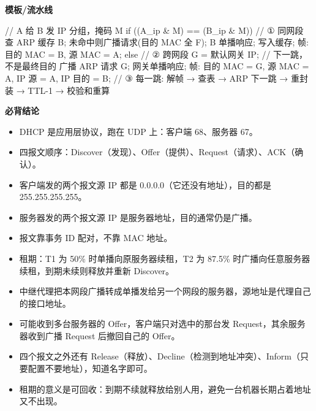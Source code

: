 \documentclass[10pt,a4paper]{ctexart}
\begin{document}
\textbf{模板/流水线}

\begin{codebox}
// A 给 B 发 IP 分组，掩码 M
if ((A_ip & M) == (B_ip & M)) {         // ① 同网段
    查 ARP 缓存 B; 未命中则广播请求(目的 MAC 全 F);
    B 单播响应; 写入缓存;
    帧: 目的 MAC = B, 源 MAC = A;
} else {                                // ② 跨网段
    G = 默认网关 IP;                     // 下一跳，不是最终目的
    广播 ARP 请求 G; 网关单播响应;
    帧: 目的 MAC = G, 源 MAC = A, IP 源 = A, IP 目的 = B;
}
// ③ 每一跳: 解帧 → 查表 → ARP 下一跳 → 重封装 → TTL-1 → 校验和重算
\end{codebox}




\textbf{必背结论}

\begin{itemize}

\item DHCP 是应用层协议，跑在 UDP 上：客户端 68、服务器 67。

\item 四报文顺序：Discover（发现）、Offer（提供）、Request（请求）、ACK（确认）。

\item 客户端发的两个报文源 IP 都是 0.0.0.0（它还没有地址），目的都是 255.255.255.255。

\item 服务器发的两个报文源 IP 是服务器地址，目的通常仍是广播。

\item 报文靠事务 ID 配对，不靠 MAC 地址。

\item 租期：T1 为 50\% 时单播向原服务器续租，T2 为 87.5\% 时广播向任意服务器续租，到期未续则释放并重新 Discover。

\item 中继代理把本网段广播转成单播发给另一个网段的服务器，源地址是代理自己的接口地址。

\item 可能收到多台服务器的 Offer，客户端只对选中的那台发 Request，其余服务器收到广播 Request 后撤回自己的 Offer。

\item 四个报文之外还有 Release（释放）、Decline（检测到地址冲突）、Inform（只要配置不要地址），知道名字即可。

\item 租期的意义是可回收：到期不续就释放给别人用，避免一台机器长期占着地址又不出现。

\end{itemize}
\end{document}
